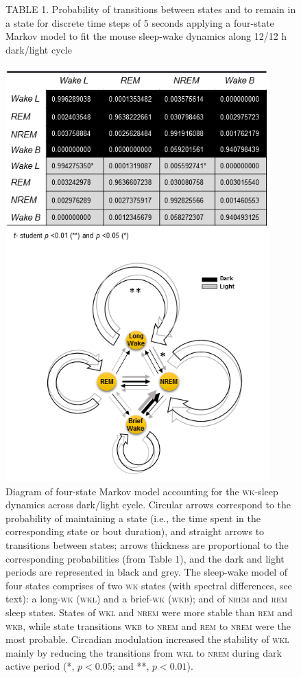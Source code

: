 \documentclass[10pt,letterpaper]{article}
\def\REM/{\textsc{rem}}
\def\NREM/{\textsc{nrem}}
\def\WK/{\textsc{wk}}
\def\WKL/{\textsc{wkl}}
\def\WKB/{\textsc{wkb}}
\begin{document}
\begin{figure}
	\vspace{1cm}
	TABLE 1. Probability of transitions between states and to remain in a state for discrete time steps
of 5 seconds applying a four-state Markov model to fit the mouse sleep-wake dynamics along 12/12
h dark/light cycle
\begin{center}
	\includegraphics[height=16cm]{fmk_3.png}
\end{center}
	\caption{Diagram of four-state Markov model accounting for the \WK/-sleep dynamics across dark/light cycle. Circular arrows correspond to the probability of maintaining a state (i.e., the time spent in the corresponding state or bout duration), and straight arrows to transitions between states; arrows thickness are proportional to the corresponding probabilities (from Table 1), and the dark and light periods are represented in black and grey. The sleep-wake model of four states comprises of two \WK/ states (with spectral differences, see text): a long-\WK/ (\WKL/) and a brief-\WK/ (\WKB/); and of \NREM/ and \REM/ sleep states. States of \WKL/ and \NREM/ were more stable than \REM/ and \WKB/, while state transitions \WKB/ to \NREM/ and \REM/ to \NREM/ were the most probable. Circadian modulation increased the stability of \WKL/ mainly by reducing the transitions from \WKL/ to \NREM/ during dark active period (*, $ p  < 0.05$; and **,  $p  < 0.01$). }
          \label{fig_model}
\end{figure}
\end{document}
